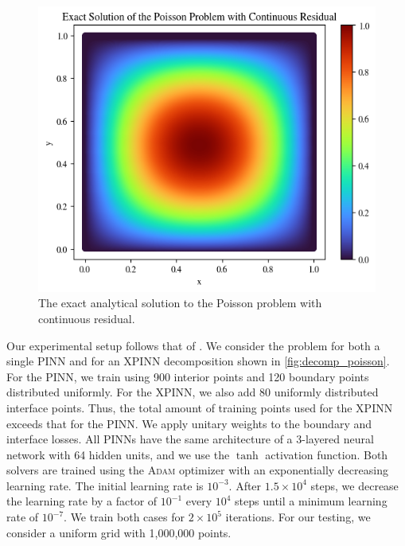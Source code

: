 \begin{figure}[h]
    \centering
    \includegraphics[width=0.8\linewidth]{Project1XPINNs/figures/Poisson/Exact_Smooth.png}
    \caption{The exact analytical solution to the Poisson problem with continuous residual.}
    \label{fig:exact_smooth}
\end{figure}

Our experimental setup follows that of \textcite{müller2023achieving}.
We consider the problem for both a single PINN and for an XPINN decomposition shown in \autoref{fig:decomp_poisson}.
For the PINN, we train using 900 interior points and 120 boundary points distributed uniformly.
For the XPINN, we also add 80 uniformly distributed interface points. Thus, the total amount of training points used for the XPINN exceeds that for the PINN. We apply unitary weights to the boundary and interface losses. All PINNs have the same architecture of a 3-layered neural network with 64 hidden units, and we use the $\tanh$ activation function. 
Both solvers are trained using the \textsc{Adam} optimizer with an exponentially decreasing learning rate.
The initial learning rate is $10^{-3}$.
After $1.5\times 10^4$ steps, we decrease the learning rate by a factor of $10^{-1}$ every $10^4$ steps until a minimum learning rate of $10^{-7}$.
We train both cases for $2\times 10^5$ iterations. For our testing, we consider a uniform grid with 1,000,000 points. 

